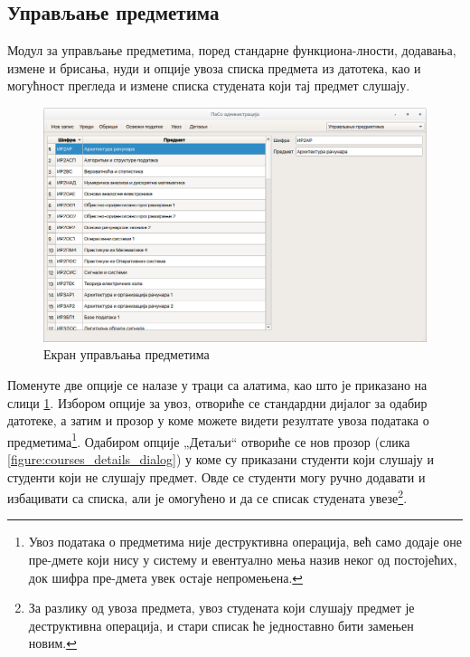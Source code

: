 \documentclass[a4paper, 12pt, diplomski]{etfcyr}
\def\quote#1{„#1“}
\begin{document}
			\subsection{Управљање предметима}
				\begin{justify}
					Модул за управљање предметима, поред стандарне функциона-лности, додавања, измене и брисања, нуди и опције увоза списка предмета из датотека, као и могућност прегледа и измене списка студената који тај предмет слушају.
					\begin{figure}[h]
						\begin{center}
							\includegraphics[width=1.0\textwidth]{manual/courses_main_window.png}
						\end{center}
						\caption{Екран управљања предметима}
						\label{figure:courses_main_window}
					\end{figure}
					Поменуте две опције се налазе у траци са алатима, као што је приказано на слици \ref{figure:courses_main_window}. Избором опције за увоз, отвориће се стандардни дијалог за одабир датотеке, а затим и прозор у коме можете видети резултате увоза података о предметима\footnote{Увоз података о предметима није деструктивна операција, већ само додаје оне пре-дмете који нису у систему и евентуално мења назив неког од постојећих, док шифра пре-дмета увек остаје непромењена.}.
					Одабиром опције \quote{Детаљи} отвориће се нов прозор (слика \ref{figure:courses_details_dialog}) у коме су приказани студенти који слушају и студенти који не слушају предмет. Овде се студенти могу ручно додавати и избацивати са списка, али је омогућено и да се списак студената увезе\footnote{За разлику од увоза предмета, увоз студената који слушају предмет је деструктивна операција, и стари списак ће једноставно бити замењен новим.}.


\end{justify}
\end{document}
